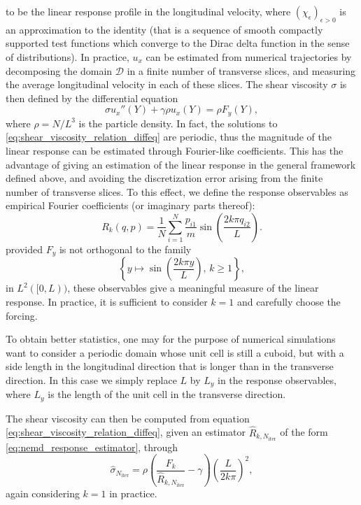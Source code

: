 to be the linear response profile in the longitudinal velocity, where $(\chi_\epsilon)_{\epsilon>0}$ is an approximation to the identity (that is a sequence of smooth compactly supported test functions which converge to the Dirac delta function in the sense of distributions).
In practice, $u_x$ can be estimated from numerical trajectories by decomposing the domain $\mathcal D$ in a finite number of transverse slices,
 and measuring the average longitudinal velocity in each of these slices.
 The shear viscosity $\sigma$ is then defined by the differential equation
\begin{equation}
    \label{eq:shear_viscosity_relation_diffeq}
    \sigma u_x''(Y)+\gamma \rho u_x(Y)=\rho F_y(Y),
\end{equation}
where $\rho= N/L^3$ is the particle density.
In fact, the solutions to \eqref{eq:shear_viscosity_relation_diffeq} are periodic, thus the magnitude of the linear response can be estimated through Fourier-like coefficients.
This has the advantage of giving an estimation of the linear response in the general framework defined above, and avoiding the discretization error arising from the finite number of transverse slices.
To this effect, we define the response observables as empirical Fourier coefficients (or imaginary parts thereof):
\begin{equation}
    \label{eq:nemd_shear_viscosity_response}
    R_k(q,p)=\frac{1}N\sum_{i=1}^N\frac{p_{i1}}{m}\sin\left(\frac{2k\pi q_{i2}}{L}\right).
\end{equation}
provided $F_y$ is not orthogonal to the family
\[\left\{ y\mapsto \sin\left(\frac{2k\pi y}{L}\right),\,k\geq 1\right\} ,\]
in $L^2([0,L))$, these observables give a meaningful measure of the linear response. In practice, it is sufficient to consider $k=1$ and carefully choose the forcing.
\begin{remark}
    To obtain better statistics, one may for the purpose of numerical simulations want to consider a periodic domain whose unit cell is still a cuboid, but with a side length in the longitudinal direction that is longer than in the transverse direction.
    In this case we simply replace $L$ by $L_y$ in the response observables, where $L_y$ is the length of the unit cell in the transverse direction.
\end{remark}
The shear viscosity can then be computed from equation \eqref{eq:shear_viscosity_relation_diffeq}, given an estimator $\widehat{R}_{k,N_{\mathrm{iter}}}$ of the form \eqref{eq:nemd_response_estimator}, through
\begin{equation}
    \label{eq:shear_viscosity_nemd_estimator}
    \hat{\sigma}_{N_{\mathrm{iter}}}=\rho\left(\frac{F_k}{\widehat{R}_{k,N_{\mathrm{iter}}}}-\gamma\right)\left(\frac{L}{2k\pi}\right)^2,
\end{equation}
again considering $k=1$ in practice.
